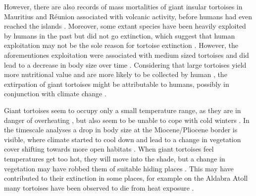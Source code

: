 However, there are also records of mass mortalities of giant insular tortoises in Mauritius and Réunion associated with volcanic activity, before humans had even reached the islands \citep{Cheke2016}. 
Moreover, some extant species have been heavily exploited by humans in the past but did not go extinction, which suggest that human exploitation may not be the sole reason for tortoise extinction \citep{Stiner1999,Steele2005}. 
However, the aforementiones exploitation were associated with medium sized tortoises and did lead to a decrease in body size over time \citep{Stiner1999,Steele2005}.
Considering that large tortoises yield more nutritional value and are more likely to be collected by human \citep{Rhodin2015}, the extirpation of giant tortoises might be attributable to humans, possibly in conjunction with climate change \citep{Cione2003}.

Giant tortoises seem to occupy only a small temperature range, as they are in danger of overheating \citep{Swingland1979,Schleich1981}, but also seem to be unable to cope with cold winters \citep{Hibbard1960}. In the timescale analyses a drop in body size at the Miocene/Pliocene border is visible, where climate started to cool down and lead to a change in vegetation cover shifting towards more open habitats \citep{Domingo2009}. When giant tortoises feel temperatures get too hot, they will move into the shade, but a change in vegetation may have robbed them of suitable hiding places \citep{Sturbaum1982,Hunter2013, Cheke2016, Schleich1981}. This may have contributed to their extinction in some places, for example on the Aldabra Atoll many tortoises have been observed to die from heat exposure \citep{Swingland1979}.






